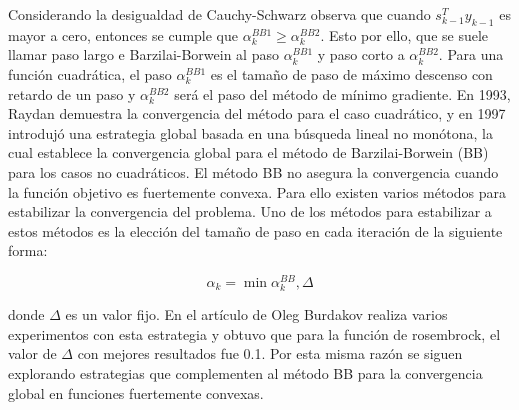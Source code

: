 Considerando la desigualdad de Cauchy-Schwarz observa que cuando $s_{k-1}^Ty_{k-1}$ es mayor a cero, entonces se cumple que $\alpha_k^{BB1} \geq \alpha_k^{BB2}$. Esto por ello, que se suele llamar paso largo e Barzilai-Borwein al paso $\alpha_k^{BB1}$ y paso corto a $\alpha_k^{BB2}$. Para una función cuadrática, el paso $\alpha_k^{BB1}$ es el tamaño de paso de máximo descenso con retardo de un paso y $\alpha_k^{BB2}$ será el paso del método de mínimo gradiente. En 1993, Raydan demuestra la convergencia del método para el caso cuadrático\cite{raydan_1993}, y en 1997\cite{raydan_1997} introdujó una estrategia global basada en una búsqueda lineal no monótona, la cual establece la convergencia global para el método de Barzilai-Borwein (BB) para los casos no cuadráticos. El método BB no asegura la convergencia cuando la función objetivo es fuertemente convexa. Para ello existen varios métodos para estabilizar la convergencia del problema. Uno de los métodos para estabilizar a estos métodos es la elección del tamaño de paso en cada iteración de la siguiente forma:

\begin{equation}
    \alpha_k = \min \alpha_k^{BB}, \Delta
\end{equation}

donde $\Delta$ es un valor fijo. En el artículo de Oleg Burdakov\cite{burdakob_2019} realiza varios experimentos con esta estrategia y obtuvo que para la función de rosembrock, el valor de $\Delta$ con mejores resultados fue 0.1. Por esta misma razón se siguen explorando estrategias que complementen al método BB para la convergencia global en funciones fuertemente convexas.